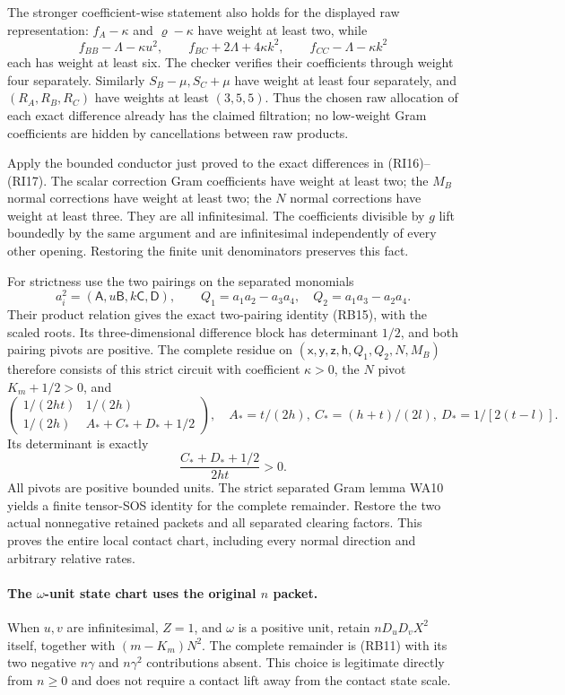 The stronger coefficient-wise statement also holds for the displayed
raw representation: $f_A-\kappa$ and $\varrho-\kappa$ have weight at
least two, while
\[
 f_{BB}-\Lambda-\kappa u^2,\qquad
 f_{BC}+2\Lambda+4\kappa k^2,\qquad
 f_{CC}-\Lambda-\kappa k^2
\]
each has weight at least six. The checker verifies their coefficients
through weight four separately. Similarly $S_B-\mu,S_C+\mu$ have
weight at least four separately, and $(R_A,R_B,R_C)$ have weights
at least $(3,5,5)$. Thus the chosen raw allocation of each exact
difference already has the claimed filtration; no low-weight
Gram coefficients are hidden by cancellations between raw products.

Apply the bounded conductor just proved to the exact differences in
(RI16)--(RI17). The scalar correction Gram coefficients have weight
at least two; the $M_B$ normal corrections have weight at least two;
the $N$ normal corrections have weight at least three. They are all
infinitesimal. The coefficients divisible by $g$ lift boundedly by the
same argument and are infinitesimal independently of every other
opening. Restoring the finite unit denominators preserves this fact.

For strictness use the two pairings on the separated monomials
\[
 a_i^2=(\mathsf A,u\mathsf B,k\mathsf C,\mathsf D),\qquad
 Q_1=a_1a_2-a_3a_4,\quad Q_2=a_1a_3-a_2a_4.
\]
Their product relation gives the exact two-pairing identity (RB15),
with the scaled roots. Its three-dimensional difference block has
determinant $1/2$, and both pairing pivots are positive. The complete
residue on
$(\mathsf x,\mathsf y,\mathsf z,\mathsf h,Q_1,Q_2,N,M_B)$
therefore consists of this strict circuit with coefficient
$\kappa>0$, the $N$ pivot $K_m+1/2>0$, and
\[
 \begin{pmatrix}
 1/(2ht)&1/(2h)\\
 1/(2h)&A_*+C_*+D_*+1/2
 \end{pmatrix},
 \quad A_*=t/(2h),\ C_*=(h+t)/(2l),\ D_*=1/[2(t-l)].
 \tag{RI19}
\]
Its determinant is exactly
\[
 \frac{C_*+D_*+1/2}{2ht}>0.                         \tag{RI20}
\]
All pivots are positive bounded units. The strict separated Gram
lemma WA10 yields a finite tensor-SOS identity for the complete
remainder. Restore the two actual nonnegative retained packets and
all separated clearing factors. This proves the entire local contact
chart, including every normal direction and arbitrary relative rates.

\paragraph{The $\omega$-unit state chart uses the original $n$ packet.}
When $u,v$ are infinitesimal, $Z=1$, and $\omega$ is a positive unit,
retain $nD_uD_vX^2$ itself, together with $(m-K_m)N^2$.
The complete remainder is (RB11) with its two negative $n\gamma$
and $n\gamma^2$ contributions absent. This choice is legitimate
directly from $n\geq0$ and does not require a contact lift away from
the contact state scale.

